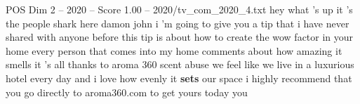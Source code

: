 \begin{textsample}{POS Dim 2 – 2020 – Score 1.00 – 2020/tv\_com\_2020\_4.txt}  \label{ex:f2_pos_076}
hey what 's up it 's the people shark here damon john i 'm going to give you a tip that i have never shared with anyone before this tip is about how to create the wow factor in your home every person that comes into my home comments about how amazing it smells it 's all thanks to aroma 360 scent abuse we feel like we live in a luxurious hotel every day and i love how evenly it \textbf{sets} our space i highly recommend that you go directly to aroma360.com to get yours today you

\end{textsample}
